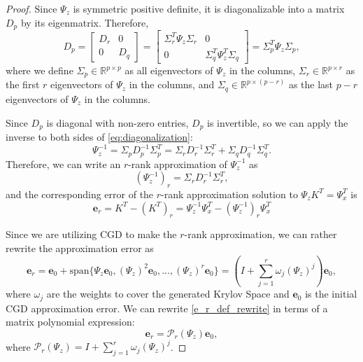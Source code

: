 \documentclass[10pt,a4paper]{amsart}
\newcommand{\vect}[1]{\ensuremath{\bm{#1}}}
\begin{document}
\begin{proof}
Since $\Psi_{z}$ is symmetric positive definite, it is diagonalizable into a matrix $D_p$ by its eigenmatrix.  Therefore,
\begin{equation}
D_p = \begin{bmatrix}
 D_r & 0\\
 0 & D_q
\end{bmatrix} = \begin{bmatrix}
 \Sigma_r^T \Psi_{z} \Sigma_r & 0\\
 0 & \Sigma_q^T \Psi_{z}^T \Sigma_q
\end{bmatrix} 
= \Sigma_p^T \Psi_{z} \Sigma_p,
\label{eq:diagonalization}
\end{equation}
where we define $\Sigma_p \in \mathbb{R}^{p \times p}$ as all eigenvectors of $\Psi_{z}$ in the columns, $\Sigma_r \in \mathbb{R}^{p \times r}$ as the first $r$ eigenvectors of $\Psi_{z}$ in the columns, and $\Sigma_q \in \mathbb{R}^{p \times (p-r)}$ as the last $p-r$ eigenvectors of $\Psi_{z}$ in the columns.

Since $D_p$ is diagonal with non-zero entries, $D_p$ is invertible, so we can apply the inverse to both sides of \eqref{eq:diagonalization}:
\begin{equation}
    \Psi_{z}^{-1} = \Sigma_p D_p^{-1} \Sigma_p^T = \Sigma_r D_r^{-1} \Sigma_r^T + \Sigma_q D_q^{-1} \Sigma_q^T.
\end{equation}
Therefore, we can write an $r$-rank approximation of $\Psi_{z}^{-1}$ as
\begin{equation}
(\Psi_{z}^{-1})_r = \Sigma_r D_r^{-1} \Sigma_r^T,
\end{equation}
and the corresponding error of the $r$-rank approximation solution to $\Psi_{z}K^T = \Psi_{x}^T$ is
\begin{equation}
    \vect{e}_r = K^T - (K^T)_r = \Psi_{z}^{-1}\Psi_{x}^T - (\Psi_{z}^{-1})_r\Psi_{x}^T
    \label{eq:e_r_def}
\end{equation}


Since we are utilizing CGD to make the $r$-rank approximation, we can rather rewrite the approximation error as 
\begin{equation}
    \vect{e}_r = \vect{e}_0 + \text{span}\{\Psi_{z}\vect{e}_0, (\Psi_{z})^2\vect{e}_0,...,(\Psi_{z})^r\vect{e}_0\}
    = (I + \sum_{j=1}^{r} \omega_j(\Psi_{z})^j)\vect{e}_0,
    \label{e_r_def_rewrite}
\end{equation}
where $\omega_j$ are the weights to cover the generated Krylov Space and $\vect{e}_0$ is the initial CGD approximation error.  
We can rewrite \eqref{e_r_def_rewrite} in terms of a matrix polynomial expression:
\begin{equation}
\vect{e}_r = \mathcal{P}_r(\Psi_{z})\vect{e}_0,
\label{e_r_mat_poly}
\end{equation}
where $\mathcal{P}_r(\Psi_{z}) = I + \sum_{j=1}^{r} \omega_j(\Psi_{z})^j$.



\end{proof}
\end{document}
